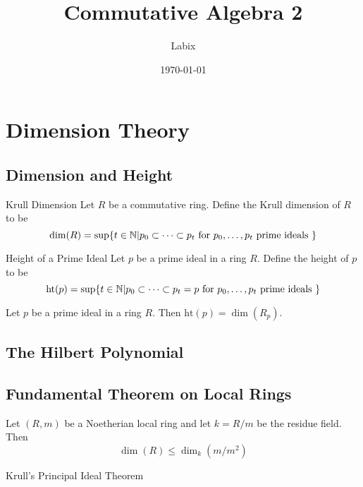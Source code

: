 \documentclass[a4paper]{article}
\title{Commutative Algebra 2}
\author{Labix}
\date{\today}
\begin{document}
\maketitle
\begin{abstract}
\end{abstract}
\pagebreak
\tableofcontents
\pagebreak

\pagebreak
\section{Dimension Theory}
\subsection{Dimension and Height}
\begin{defn}{Krull Dimension}{} Let $R$ be a commutative ring. Define the Krull dimension of $R$ to be $$\dim(R)=\sup\{t\in\mathbb{N}|p_0\subset\dots\subset p_t\text{ for }p_0,\dots,p_t\text{ prime ideals }\}$$
\end{defn}

\begin{defn}{Height of a Prime Ideal}{} Let $p$ be a prime ideal in a ring $R$. Define the height of $p$ to be $$\text{ht}(p)=\sup\{t\in\mathbb{N}|p_0\subset\dots\subset p_t=p\text{ for }p_0,\dots,p_t\text{ prime ideals }\}$$
\end{defn}

\begin{lmm}{}{} Let $p$ be a prime ideal in a ring $R$. Then $\text{ht}(p)=\dim(R_p)$. 
\end{lmm}

\subsection{The Hilbert Polynomial}

\subsection{Fundamental Theorem on Local Rings}
\begin{thm}{}{}
\end{thm}

\begin{prp}{}{} Let $(R,m)$ be a Noetherian local ring and let $k=R/m$ be the residue field. Then $$\dim(R)\leq\dim_k(m/m^2)$$
\end{prp}

\begin{thm}{Krull's Principal Ideal Theorem}{}
\end{thm}
\end{document}
